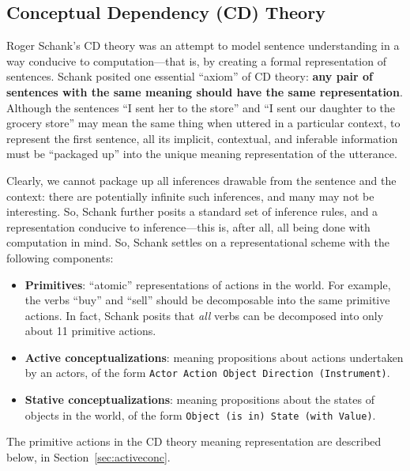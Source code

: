 \iffalse
\subsection{Conceptual Dependency (CD) Theory}

Roger Schank's CD theory \citep{schank1975concdep} was an attempt to model sentence understanding in a way conducive to computation---that is, by creating a formal representation of sentences. Schank posited one essential ``axiom'' of CD theory: \textbf{any pair of sentences with the same meaning should have the same representation}. Although the sentences ``I sent her to the store'' and ``I sent our daughter to the grocery store'' may mean the same thing when uttered in a particular context, to represent the first sentence, all its implicit, contextual, and inferable information must be ``packaged up'' into the unique meaning representation of the utterance.

Clearly, we cannot package up all inferences drawable from the sentence and the context: there are potentially infinite such inferences, and many may not be interesting. So, Schank further posits a standard set of inference rules, and a representation conducive to inference---this is, after all, all being done with computation in mind. So, Schank settles on a representational scheme with the following components:

\begin{itemize}
    \item \textbf{Primitives}: ``atomic'' representations of actions in the world. For example, the verbs ``buy'' and ``sell'' should be decomposable into the same primitive actions. In fact, Schank posits that \textit{all} verbs can be decomposed into only about 11 primitive actions.
    \item \textbf{Active conceptualizations}: meaning propositions about actions undertaken by an actors, of the form \texttt{Actor Action Object Direction (Instrument)}.
    \item \textbf{Stative conceptualizations}: meaning propositions about the states of objects in the world, of the form \texttt{Object (is in) State (with Value)}.
\end{itemize}

The primitive actions in the CD theory meaning representation are described below, in Section~\ref{sec:activeconc}.


